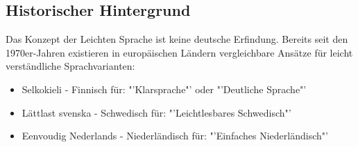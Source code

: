 \subsection{Historischer Hintergrund}
Das Konzept der Leichten Sprache ist keine deutsche Erfindung.
Bereits seit den 1970er-Jahren existieren in europäischen Ländern vergleichbare Ansätze für leicht verständliche Sprachvarianten:
\begin{itemize}
	\item Selkokieli - Finnisch für: "'Klarsprache"' oder "'Deutliche Sprache"'
	\item Lättlast svenska - Schwedisch für: "'Leichtlesbares Schwedisch"'
	\item Eenvoudig Nederlands - Niederländisch für: "'Einfaches Niederländisch"'
\end{itemize}

